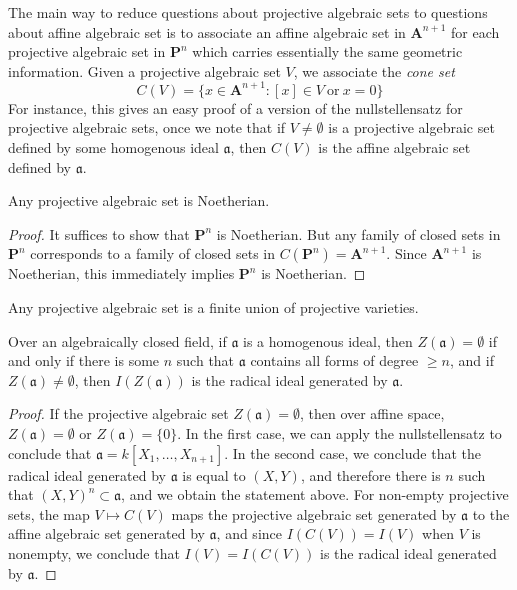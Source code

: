 The main way to reduce questions about projective algebraic sets to questions about affine algebraic set is to associate an affine algebraic set in $\mathbf{A}^{n+1}$ for each projective algebraic set in $\mathbf{P}^n$ which carries essentially the same geometric information. Given a projective algebraic set $V$, we associate the \emph{cone set}
%
\[ C(V) = \{ x \in \mathbf{A}^{n+1}: [x] \in V\ \text{or}\ x = 0 \} \]
%
For instance, this gives an easy proof of a version of the nullstellensatz for projective algebraic sets, once we note that if $V \neq \emptyset$ is a projective algebraic set defined by some homogenous ideal $\mathfrak{a}$, then $C(V)$ is the affine algebraic set defined by $\mathfrak{a}$.

\begin{theorem}
    Any projective algebraic set is Noetherian.
\end{theorem}
\begin{proof}
    It suffices to show that $\mathbf{P}^n$ is Noetherian. But any family of closed sets in $\mathbf{P}^n$ corresponds to a family of closed sets in $C(\mathbf{P}^n) = \mathbf{A}^{n+1}$. Since $\mathbf{A}^{n+1}$ is Noetherian, this immediately implies $\mathbf{P}^n$ is Noetherian.
\end{proof}

\begin{corollary}
    Any projective algebraic set is a finite union of projective varieties.
\end{corollary}

\begin{theorem}
    Over an algebraically closed field, if $\mathfrak{a}$ is a homogenous ideal, then $Z(\mathfrak{a}) = \emptyset$ if and only if there is some $n$ such that $\mathfrak{a}$ contains all forms of degree $\geq n$, and if $Z(\mathfrak{a}) \neq \emptyset$, then $I(Z(\mathfrak{a}))$ is the radical ideal generated by $\mathfrak{a}$.
\end{theorem}
\begin{proof}
    If the projective algebraic set $Z(\mathfrak{a}) = \emptyset$, then over affine space, $Z(\mathfrak{a}) = \emptyset$ or $Z(\mathfrak{a}) = \{ 0 \}$. In the first case, we can apply the nullstellensatz to conclude that $\mathfrak{a} = k[X_1, \dots, X_{n+1}]$. In the second case, we conclude that the radical ideal generated by $\mathfrak{a}$ is equal to $(X,Y)$, and therefore there is $n$ such that $(X,Y)^n \subset \mathfrak{a}$, and we obtain the statement above. For non-empty projective sets, the map $V \mapsto C(V)$ maps the projective algebraic set generated by $\mathfrak{a}$ to the affine algebraic set generated by $\mathfrak{a}$, and since $I(C(V)) = I(V)$ when $V$ is nonempty, we conclude that $I(V) = I(C(V))$ is the radical ideal generated by $\mathfrak{a}$.
\end{proof}

